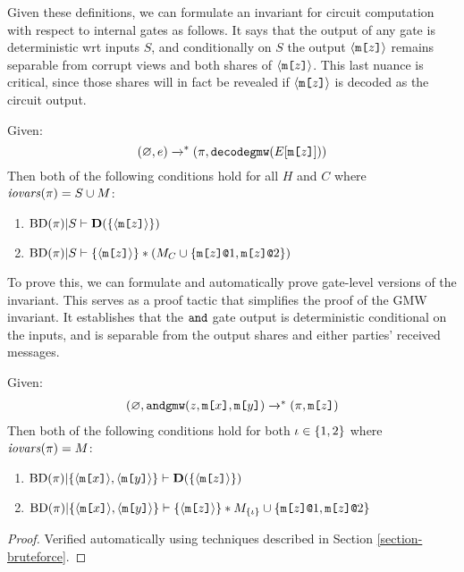 Given these definitions, we can formulate an invariant
for circuit computation with respect to internal gates
as follows. It says that the output of any gate is
deterministic wrt inputs $S$, and conditionally
on $S$ the output $\langle \texttt{m[}z\texttt{]} \rangle$ remains
separable from corrupt views and both shares of
$\langle \texttt{m[}z\texttt{]} \rangle$. This last nuance is critical,
since those shares will in fact be revealed if
$\langle \texttt{m[}z\texttt{]} \rangle$ is decoded as the circuit output. 
\begin{lemma}
  \label{lemma-gmwinvariant}
  Given:
  $$ (\varnothing,e) \xrightarrow{}^{*} (\pi,\texttt{decodegmw}(E[\texttt{m[}z\texttt{]}])) $$
  Then both of the following conditions hold for all $H$ and $C$ where $\mathit{iovars}(\pi) = S \cup M$:
  \begin{enumerate}
    \item $\mathrm{BD}(\pi)|S \vdash \mathbf{D}(\{\langle \texttt{m[}z\texttt{]} \rangle\})$
    \item $\mathrm{BD}(\pi)|S \vdash \{\langle \texttt{m[}z\texttt{]} \rangle\} * (M_C \cup \{ \texttt{m[}z\texttt{]}\texttt{@}1, \texttt{m[}z\texttt{]}\texttt{@}2 \})$
  \end{enumerate}
\end{lemma}
To prove this, we can formulate and automatically prove gate-level
versions of the invariant. This serves as a proof tactic
that simplifies the proof of the GMW invariant. It establishes
that the $\texttt{and}$ gate output is deterministic conditional on
the inputs, and is separable from the output shares and
either parties' received messages. 
\begin{lemma}
  \label{lemma-gmwtactic}
  Given:
  $$
  \begin{array}{c}
  (\varnothing,\andgmw(z,\mesg{x},\mesg{y}) \redxs %
  (\prog,\mesg{z})
  \end{array}
  $$
  Then both of the following conditions hold for both $\iota \in \{ 1,2 \}$ where $\mathit{iovars}(\pi) = M$:
  \begin{enumerate}
  \item
    $\mathrm{BD}(\pi)|\{ \langle \texttt{m[}x\texttt{]} \rangle,\langle \texttt{m[}y\texttt{]} \rangle \} \vdash \mathbf{D}(\{ \langle \texttt{m[}z\texttt{]} \rangle \})$
   \item $\mathrm{BD}(\pi)|\{ \langle \texttt{m[}x\texttt{]} \rangle,\langle \texttt{m[}y\texttt{]} \rangle \} \vdash \{ \langle \texttt{m[}z\texttt{]} \rangle \} * M_{\{\iota\}} \cup \{ \texttt{m[}z\texttt{]}\texttt{@}1,\texttt{m[}z\texttt{]}\texttt{@}2 \}$
  \end{enumerate}
\end{lemma}
\begin{proof}
Verified automatically using techniques described in Section \ref{section-bruteforce}.  
\end{proof}

